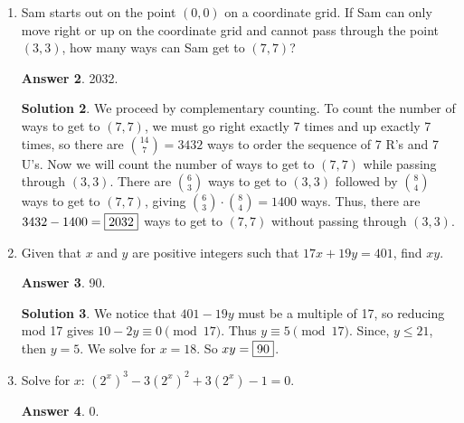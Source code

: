 \documentclass[11pt]{article}
\theoremstyle{definition}
\newtheorem*{solution}{Solution}
\newtheorem*{answer}{Answer}
\begin{document}
\begin{enumerate}
\begin{answer}
253968.
\end{answer}
\begin{solution}
 All multiples of 11 have the property that the sum of alternating digits are equivalent mod 11. Using this property we can figure out that the third digit is 3, the next is 9, the next is 6, and the last is 9, giving us a 6-digit telephone number of .
\end{solution}

\item %
Sam starts out on the point $(0, 0)$ on a coordinate grid. If Sam can only move right or up on the coordinate grid and cannot pass through the point $(3, 3)$, how many ways can Sam get to $(7, 7)$?

\begin{answer}
2032.
\end{answer}
\begin{solution}
 We proceed by complementary counting. To count the number of ways to get to $(7, 7)$, we must go right exactly 7 times and up exactly 7 times, so there are $\binom{14}{7} = 3432$ ways to order the sequence of 7 R's and 7 U's. Now we will count the number of ways to get to $(7, 7)$ while passing through $(3, 3)$. There are $\binom{6}{3}$ ways to get to $(3, 3)$ followed by $\binom{8}{4}$ ways to get to $(7, 7)$, giving $\binom{6}{3} \cdot \binom{8}{4} = 1400$ ways. Thus, there are $3432 - 1400 = \framebox{2032}$ ways to get to $(7, 7)$ without passing through $(3, 3)$.
\end{solution}

\item %
Given that $x$ and $y$ are positive integers such that $17x+19y = 401$, find $xy$.

\begin{answer}
90.
\end{answer}
\begin{solution}
 We notice that $401 - 19y$ must be a multiple of 17, so reducing mod 17 gives $10 - 2y \equiv 0 \pmod{17}$. Thus $y \equiv 5 \pmod{17}$. Since, $y \leq 21$, then $y = 5$. We solve for $x = 18$. So $xy = \framebox{90}$.
\end{solution}

\item %
Solve for $x$: $(2^x)^3 - 3(2^x)^2 + 3(2^x) - 1 = 0$.

\begin{answer}
0.
\end{answer}


\end{enumerate}
\end{document}
